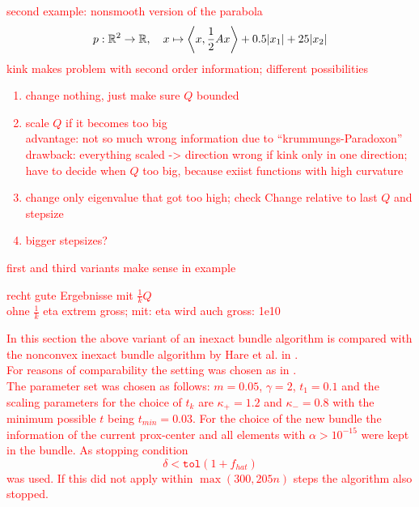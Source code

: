 \textcolor{red}{second example: nonsmooth version of the parabola
	\[ p: \mathbb{R}^2 \to \mathbb{R}, \quad x \mapsto \left\langle x, \frac{1}{2}Ax\right\rangle + 0.5 |x_1|+25|x_2|\]
	kink makes problem with second order information; different possibilities\\
	\begin{enumerate}
		\item change nothing, just make sure \(Q\) bounded
		\item scale \(Q\) if it becomes too big \\
		advantage: not so much wrong information due to ``krummungs-Paradoxon''\\
		drawback: everything scaled -> direction wrong if kink only in one direction; have to decide when \(Q\) too big, because exiist functions with high curvature
		\item change only eigenvalue that got too high; check Change relative to last \(Q\) and stepsize
		\item bigger stepsizes?
	\end{enumerate}
	first and third variants make sense in example}


\textcolor{red}{recht gute Ergebnisse mit \(\frac{1}{k}Q\)\\
ohne \(\frac{1}{k}\) eta extrem gross; mit: eta wird auch gross: 1e10}

\textcolor{red}{In this section the above variant of an inexact bundle algorithm is compared with the nonconvex inexact bundle algorithm by Hare et al. in \cite{Hare2016}.\\
For reasons of comparability the setting was chosen as in \cite{Hare2016}.\\
The parameter set was chosen as follows: \(m = 0.05\), \(\gamma = 2\), \(t_1 = 0.1\) and the scaling parameters for the choice of \(t_k\) are \(\kappa_{+}=1.2\) and \(\kappa_{-}=0.8\) with the minimum possible \(t\) being \(t_{min}=0.03\).
For the choice of the new bundle the information of the current prox-center and all elements with \(\alpha > 10^{-15}\) were kept in the bundle.
As stopping condition  
\[ \delta < \mathtt{tol}(1+f_{hat}) \]
was used.
If this did not apply within \(\max(300,205n)\) steps the algorithm also stopped.}

